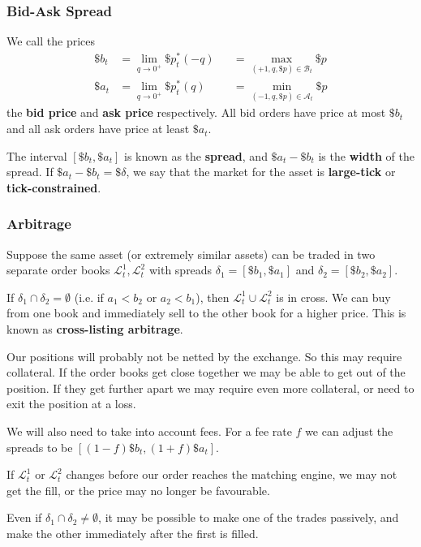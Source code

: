 \documentclass{article}
\begin{document}
\subsubsection{Bid-Ask Spread}
We call the prices
\begin{align*}
	\$b_t	&= \lim_{q\to0^+} \$p^*_t(-q)	&&= \max_{(+1,q,\$p)\in\mathcal{B}_t} \$p
\\	\$a_t	&= \lim_{q\to0^+} \$p^*_t(q)	&&= \min_{(-1,q,\$p)\in\mathcal{A}_t} \$p
\end{align*}
the \textbf{bid price} and \textbf{ask price} respectively. All bid orders have price at most $\$b_t$ and all ask orders have price at least $\$a_t$.%

The interval $[\$b_t,\$a_t]$ is known as the \textbf{spread}, and $\$a_t-\$b_t$ is the \textbf{width} of the spread. If $\$a_t-\$b_t=\$\delta$, we say that the market for the asset is \textbf{large-tick} or \textbf{tick-constrained}.%

\subsubsection{Arbitrage}
Suppose the same asset (or extremely similar assets) can be traded in two separate order books $\mathcal{L}_t^1, \mathcal{L}_t^2$ with spreads $\delta_1 = [\$b_1,\$a_1]$ and $\delta_2 = [\$b_2, \$a_2]$.

If $\delta_1\cap\delta_2=\emptyset$ (i.e. if $a_1<b_2$ or $a_2<b_1$), then $\mathcal{L}_t^1\cup\mathcal{L}_t^2$ is in cross. We can buy from one book and immediately sell to the other book for a higher price. This is known as \textbf{cross-listing arbitrage}.

Our positions will probably not be netted by the exchange. So this may require collateral. If the order books get close together we may be able to get out of the position. If they get further apart we may require even more collateral, or need to exit the position at a loss.%

We will also need to take into account fees. For a fee rate $f$ we can adjust the spreads to be $[(1-f)\$b_t,(1+f)\$a_t]$.

If $\mathcal{L}_t^1$ or $\mathcal{L}_t^2$ changes before our order reaches the matching engine, we may not get the fill, or the price may no longer be favourable.

Even if $\delta_1\cap\delta_2\not=\emptyset$, it may be possible to make one of the trades passively, and make the other immediately after the first is filled.%
\end{document}
